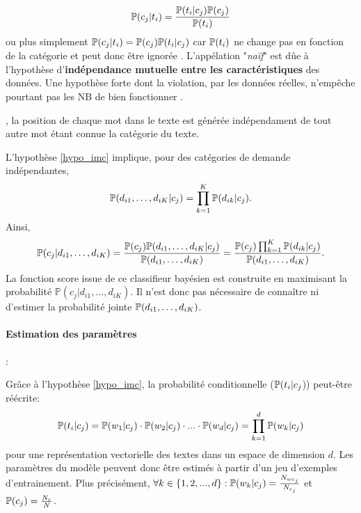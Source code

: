 \[\mathbb{P}(c_j \vert t_i) = \frac{\mathbb{P}(t_i \vert c_j)\mathbb{P}(c_j)}{\mathbb{P}(t_i)}\]
ou plus simplement  $\mathbb{P}(c_j \vert t_i) = \mathbb{P}(c_j)\mathbb{P}(t_i \vert c_j)$ car $\mathbb{P}(t_i)$ ne change pas en fonction de la catégorie et peut donc être ignorée \citep{rish2001nb_study}.
L'appélation "\textit{naïf}" est dûe à l'hypothèse d'\textbf{indépendance mutuelle entre les caractéristiques} des données. Une hypothèse %
forte dont la violation, par les données réelles, n'empêche pourtant pas les NB de bien fonctionner \citep{rish2001nb_study}. 

\begin{hypothese}, la position de chaque mot dans le texte est générée indépendament de tout autre mot étant connue la catégorie du texte. \label{hypo_imc}
\end{hypothese}

\noindent L'hypothèse \ref{hypo_imc} implique, pour des catégories de demande indépendantes,
\[
\mathbb{P}(d_{i1}, \dots, d_{iK}\vert c_j) = \prod_{k=1}^K \mathbb{P}(d_{ik} \vert c_j).
\]
Ainsi,
\begin{equation}\notag
\mathbb{P}(c_j\vert d_{i1}, \dots, d_{iK}) = \frac{\mathbb{P}(c_j)\mathbb{P}(d_{i1}, \dots, d_{iK} \vert c_j)}{\mathbb{P}(d_{i1}, \dots, d_{iK})} = \frac{\mathbb{P}(c_j)\prod_{k=1}^K \mathbb{P}(d_{ik} \vert c_j)}{\mathbb{P}(d_{i1}, \dots, d_{iK})}.
\end{equation}
La fonction score issue de ce classifieur bayésien est construite en maximisant la probabilité $\mathbb{P}(c_j\vert d_{i1}, \dots, d_{iK})$. Il n'est donc pas nécessaire de connaître ni d'estimer la probabilité jointe $\mathbb{P}(d_{i1}, \dots, d_{iK})$.

\paragraph{Estimation des paramètres}: 


Grâce à l'hypothèse \ref{hypo_imc}, la probabilité conditionnelle ($\mathbb{P}(t_i \vert c_j$)) peut-être réécrite:
\[\mathbb{P}(t_i \vert c_j) = \mathbb{P}(w_1 \vert c_j)\cdot \mathbb{P}(w_2 \vert c_j) \cdot ... \cdot \mathbb{P}(w_d \vert c_j) = \prod\limits_{k = 1}^d \mathbb{P}(w_k \vert c_j)\]
pour une représentation vectorielle des textes dans un espace de dimension $d$.
Les paramètres du modèle peuvent donc être estimés à partir d'un jeu d'exemples d'entrainement. Plus précisément, $\forall k \in \lbrace 1, 2, ..., d \rbrace: \mathbb{P}(w_k \vert c_j) = \frac{N_{wc_j}}{N_{c_j}}$ et $\mathbb{P}(c_j) = \frac{N_c}{N}$.

